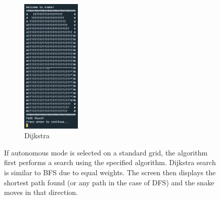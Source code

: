 \documentclass[11pt]{article}
\begin{document}
\begin{figure}[H]
\begin{subfigure}{0.24\textwidth}
    \includegraphics[height=6.5cm]{Dijkstra_Path_Found}
    \caption{Dijkstra}
    \label{fig:subim4}
\end{subfigure}

\caption{If autonomous mode is selected on a standard grid, the algorithm first performs a search using the specified algorithm. Dijkstra search is similar to BFS due to equal weights. 
The screen then displays the shortest path found (or any path in the case of DFS) and the snake moves in that direction.}
\label{fig:image2}
\end{figure}
\end{document}

